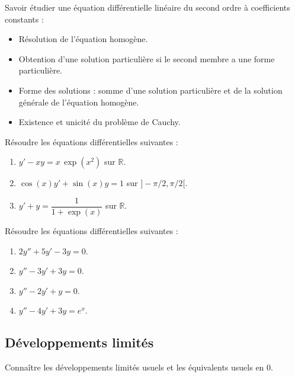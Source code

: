 \documentclass[a4paper,twoside,french,11pt]{VcCours}
\begin{document}
\begin{ptc}{}
	Savoir étudier une équation différentielle linéaire du second ordre à coefficients constants :
\begin{itemize} 
\item Résolution de l'équation homogène.
\item Obtention d'une solution particulière si le second membre a une forme particulière.
\item Forme des solutions : somme d'une solution particulière et de la solution générale de l'équation homogène.
\item Existence et unicité du problème de Cauchy.
\end{itemize}
\end{ptc}

\begin{Exercice}{}
  Résoudre les équations différentielles suivantes : 

  \begin{enumerate}
    \item $y'-xy=x\,\exp(x^2)$ sur $\mathbb{R}$.
    \item $\cos(x)y'+ \sin(x)y=1$ sur $]-\pi/2, \pi/2[$.
    \item $y'+y=\dfrac{1}{1+\exp(x)}$ sur $\mathbb{R}$.
  \end{enumerate}
\end{Exercice} 

\begin{Exercice}{}
  Résoudre les équations différentielles suivantes :

  \begin{multicols}{2}
    \begin{enumerate}
      \item $2y''+5y'-3y=0$.
      \item $y''- 3y' + 3y=0$.
      \columnbreak
      \item $y''-2y'+y=0$.
      \item $y''-4y'+3y=e^x$.
    \end{enumerate}
  \end{multicols}
\end{Exercice} 

\subsection{Développements limités}

\begin{ptc}{}
	Connaître les développements limités usuels et les équivalents usuels en $0$.
\end{ptc}
%
%
%
\end{document}
